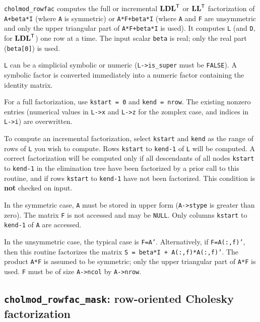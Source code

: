 \documentclass[11pt]{article}
\newcommand{\m}[1]{{\bf{#1}}}       %
\newcommand{\tr}{^{\sf T}}          %
\begin{document}
{\tt cholmod\_rowfac} computes the full or incremental $\m{LDL}\tr$ or $\m{LL}\tr$ factorization of
{\tt A+beta*I} (where {\tt A} is symmetric) or {\tt A*F+beta*I}
(where {\tt A} and {\tt F} are unsymmetric
and only the upper triangular part of {\tt A*F+beta*I} is used).  It computes
{\tt L} (and {\tt D}, for $\m{LDL}\tr$) one row at a time.
The input scalar {\tt beta} is real; only the real part ({\tt beta[0]}) is used.

{\tt L} can be a simplicial symbolic or numeric ({\tt L->is\_super} must be {\tt FALSE}).
A symbolic factor is converted immediately into a numeric factor containing
the identity matrix.

For a full factorization, use {\tt kstart = 0} and {\tt kend = nrow}.  The existing nonzero
entries (numerical values in {\tt L->x} and {\tt L->z} for the zomplex case, and indices
in {\tt L->i}) are overwritten.

To compute an incremental factorization, select {\tt kstart} and {\tt kend} as the range
of rows of {\tt L} you wish to compute.    Rows {\tt kstart} to {\tt kend-1} of {\tt L}
will be computed.  A correct factorization will be computed
only if all descendants of all nodes {\tt kstart} to {\tt kend-1} in the elimination tree have
been factorized by a prior call to this routine, and if rows {\tt kstart} to {\tt kend-1}
have not been factorized.  This condition is {\bf not} checked on input.

In the symmetric case, {\tt A} must be stored in upper form ({\tt A->stype} is greater than zero).
The matrix {\tt F} is not accessed and may be {\tt NULL}.  Only
columns {\tt kstart} to {\tt kend-1} of {\tt A} are accessed.

In the unsymmetric case,
	the typical case is {\tt F=A'}.  Alternatively, if {\tt F=A(:,f)'}, then this
	routine factorizes the matrix {\tt S = beta*I + A(:,f)*A(:,f)'}.
	The product {\tt A*F} is assumed to be symmetric;
	only the upper triangular part of {\tt A*F} is used.
	{\tt F} must be of size {\tt A->ncol} by {\tt A->nrow}.


\subsection{{\tt cholmod\_rowfac\_mask}: row-oriented Cholesky factorization}
\end{document}
